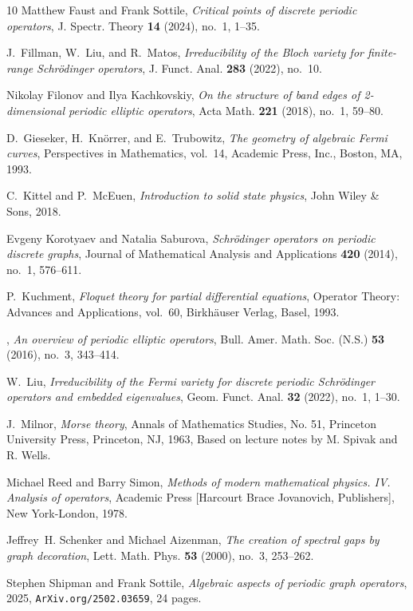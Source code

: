 \documentclass[12pt]{amsart}
\theoremstyle{remark}
\begin{document}
\begin{thebibliography}{10}
Matthew Faust and Frank Sottile, \emph{Critical points of discrete periodic
  operators}, J. Spectr. Theory \textbf{14} (2024), no.~1, 1--35.

J.~Fillman, W.~Liu, and R.~Matos, \emph{Irreducibility of the {B}loch variety
  for finite-range {S}chr{\"o}dinger operators}, J. Funct. Anal. \textbf{283}
  (2022), no.~10.

Nikolay Filonov and Ilya Kachkovskiy, \emph{On the structure of band edges of
  2-dimensional periodic elliptic operators}, Acta Math. \textbf{221} (2018),
  no.~1, 59--80. 

D.~Gieseker, H.~Kn\"{o}rrer, and E.~Trubowitz, \emph{The geometry of algebraic
  {F}ermi curves}, Perspectives in Mathematics, vol.~14, Academic Press, Inc.,
  Boston, MA, 1993.

C.~Kittel and P.~McEuen, \emph{Introduction to solid state physics}, John Wiley
  \& Sons, 2018.

Evgeny Korotyaev and Natalia Saburova, \emph{Schr{\"o}dinger operators on
  periodic discrete graphs}, Journal of Mathematical Analysis and Applications
  \textbf{420} (2014), no.~1, 576--611.

P.~Kuchment, \emph{Floquet theory for partial differential equations}, Operator
  Theory: Advances and Applications, vol.~60, Birkh\"{a}user Verlag, Basel,
  1993.

\bysame, \emph{An overview of periodic elliptic operators}, Bull. Amer. Math.
  Soc. (N.S.) \textbf{53} (2016), no.~3, 343--414.

W.~Liu, \emph{Irreducibility of the {F}ermi variety for discrete periodic
  {S}chr\"{o}dinger operators and embedded eigenvalues}, Geom. Funct. Anal.
  \textbf{32} (2022), no.~1, 1--30.

J.~Milnor, \emph{Morse theory}, Annals of Mathematics Studies, No. 51,
  Princeton University Press, Princeton, NJ, 1963, Based on lecture notes by M.
  Spivak and R. Wells.

Michael Reed and Barry Simon, \emph{Methods of modern mathematical physics.
  {IV}. {A}nalysis of operators}, Academic Press [Harcourt Brace Jovanovich,
  Publishers], New York-London, 1978.

Jeffrey~H. Schenker and Michael Aizenman, \emph{The creation of spectral gaps
  by graph decoration}, Lett. Math. Phys. \textbf{53} (2000), no.~3, 253--262.

Stephen Shipman and Frank Sottile, \emph{Algebraic aspects of periodic graph
  operators}, 2025, {\tt ArXiv.org/2502.03659}, 24 pages.

\end{thebibliography}
\end{document}
